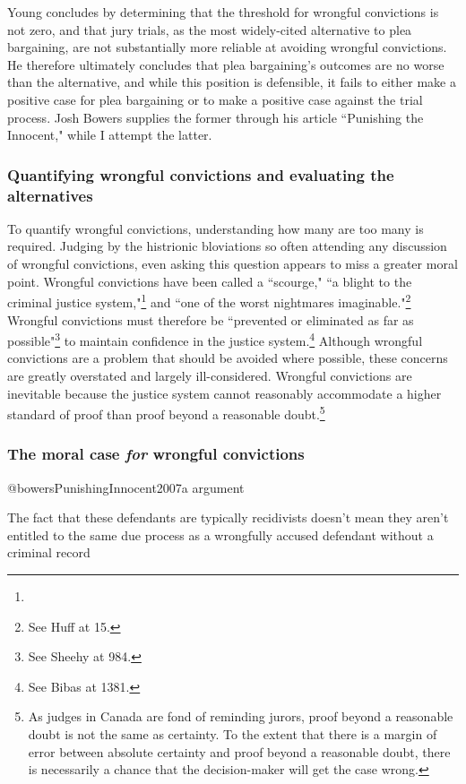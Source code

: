 Young concludes by determining that the threshold for wrongful convictions is not zero, and that jury trials, as the most widely-cited alternative to plea bargaining, are not substantially more reliable at avoiding wrongful convictions. He therefore ultimately concludes that plea bargaining's outcomes are no worse than the alternative, and while this position is defensible, it fails to either make a positive case for plea bargaining or to make a positive case against the trial process. Josh Bowers supplies the former through his article ``Punishing the Innocent," while I attempt the latter.

\subsubsection{Quantifying wrongful convictions and evaluating the alternatives}



To quantify wrongful convictions, understanding how many are too many is required. Judging by the histrionic bloviations so often attending any discussion of wrongful convictions, even asking this question appears to miss a greater moral point. Wrongful convictions have been called a ``scourge," ``a blight to the criminal justice system,"\footnote{} and ``one of the worst nightmares imaginable."\footnote{See Huff at 15.} Wrongful convictions must therefore be ``prevented or eliminated as far as possible"\footnote{See Sheehy at 984.} to maintain confidence in the justice system.\footnote{See Bibas at 1381.} Although wrongful convictions are a problem that should be avoided where possible, these concerns are greatly overstated and largely ill-considered. Wrongful convictions are inevitable because the justice system cannot reasonably accommodate a higher standard of proof than proof beyond a reasonable doubt.\footnote{As judges in Canada are fond of reminding jurors, proof beyond a reasonable doubt is not the same as certainty. To the extent that there is a margin of error between absolute certainty and proof beyond a reasonable doubt, there is necessarily a chance that the decision-maker will get the case wrong.} 

\subsubsection{The moral case \textit{for} wrongful convictions}

@bowersPunishingInnocent2007a argument

The fact that these defendants are typically recidivists doesn't mean they aren't entitled to the same due process as a wrongfully accused defendant without a criminal record

